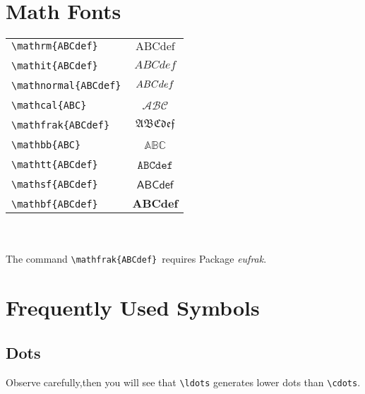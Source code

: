 \documentclass[a4paper]{report}
\begin{document}
\section{Math Fonts}
\begin{tabular}{l @{\quad} c }

\verb|\mathrm{ABCdef}| & $\mathrm{ABCdef}$\\\\

\verb|\mathit{ABCdef}| & $\mathit{ABCdef}$\\\\

\verb|\mathnormal{ABCdef}| & $\mathnormal{ABCdef}$\\\\

\verb|\mathcal{ABC}| & $\mathcal{ABC}$\\\\

\verb|\mathfrak{ABCdef}| & $\mathfrak{ABCdef}$\\\\

\verb|\mathbb{ABC}| & $\mathbb{ABC}$\\\\

\verb|\mathtt{ABCdef}| & $\mathtt{ABCdef}$\\\\

\verb|\mathsf{ABCdef}| & $\mathsf{ABCdef}$\\\\

\verb|\mathbf{ABCdef}| & $\mathbf{ABCdef}$
\end{tabular}
\\\\

The command \verb|\mathfrak{ABCdef}|\ requires Package
\emph{eufrak}.
\section{Frequently Used Symbols}
\subsection{Dots}
Observe carefully,then you will see that \verb|\ldots| generates lower dots than \verb|\cdots|.\\
\end{document}
